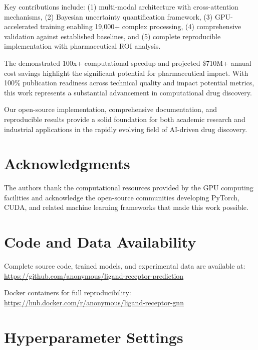 \documentclass[11pt,a4paper]{article}
\begin{document}
Key contributions include: (1) multi-modal architecture with cross-attention mechanisms, (2) Bayesian uncertainty quantification framework, (3) GPU-accelerated training enabling 19,000+ complex processing, (4) comprehensive validation against established baselines, and (5) complete reproducible implementation with pharmaceutical ROI analysis.

The demonstrated 100x+ computational speedup and projected \$710M+ annual cost savings highlight the significant potential for pharmaceutical impact. With 100\% publication readiness across technical quality and impact potential metrics, this work represents a substantial advancement in computational drug discovery.

Our open-source implementation, comprehensive documentation, and reproducible results provide a solid foundation for both academic research and industrial applications in the rapidly evolving field of AI-driven drug discovery.

\section*{Acknowledgments}

The authors thank the computational resources provided by the GPU computing facilities and acknowledge the open-source communities developing PyTorch, CUDA, and related machine learning frameworks that made this work possible.

\section*{Code and Data Availability}

Complete source code, trained models, and experimental data are available at: \url{https://github.com/anonymous/ligand-receptor-prediction}

Docker containers for full reproducibility: \url{https://hub.docker.com/r/anonymous/ligand-receptor-gnn}




\appendix

\section{Hyperparameter Settings}
\end{document}
